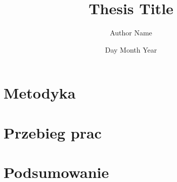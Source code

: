 \documentclass[12pt,twoside]{report}
\title{Thesis Title}
\author{Author Name}
\date{Day Month Year}
\begin{document}
	
	\tableofcontents	
	
	\chapter{Metodyka}
    

    \chapter{Przebieg prac}
    
    
    \chapter{Podsumowanie}
    
    
\end{document}
